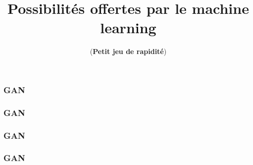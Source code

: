 \documentclass{formation}
\title{Possibilités offertes par le machine learning}
\subtitle{(\textbf{Petit jeu de rapidité})}
\begin{document}
\maketitle

\begin{frame}
  \frametitle{GAN}
\end{frame}

\begin{frame}
  \frametitle{GAN}
\end{frame}

\begin{frame}
  \frametitle{GAN}
\end{frame}

\begin{frame}
  \frametitle{GAN}
\end{frame}
\end{document}

